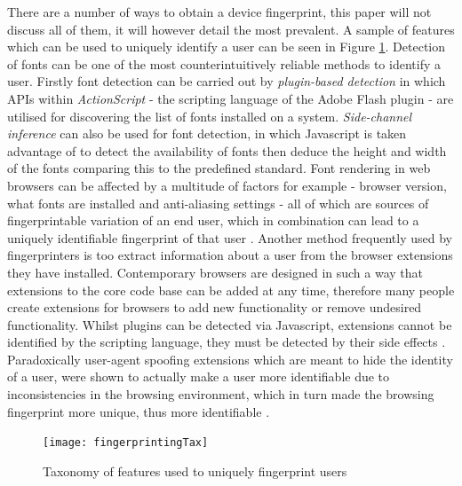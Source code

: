 \documentclass{article}
\begin{document}
There are a number of ways to obtain a device fingerprint, this paper will not discuss all of them, it will however detail the most prevalent. A sample of features which can be used to uniquely identify a user can be seen in Figure \ref{fig:fingerprintingTax}. Detection of fonts can be one of the most counterintuitively reliable methods to identify a user. Firstly font detection can be carried out by \textit{plugin-based detection} in which APIs within \textit{ActionScript} - the scripting language of the Adobe Flash plugin - are utilised for discovering the list of fonts installed on a system. \textit{Side-channel inference} can also be used for font detection, in which Javascript is taken advantage of to detect the availability of fonts then deduce the height and width of the fonts comparing this to the predefined standard. Font rendering in web browsers can be affected by a multitude of factors for example - browser version, what fonts are installed and anti-aliasing settings - all of which are sources of fingerprintable variation of an end user, which in combination can lead to a uniquely identifiable fingerprint of that user \parencite{fingerprintFonts}. Another method frequently used by fingerprinters is too extract information about a user from the browser extensions they have installed. Contemporary browsers are designed in such a way that extensions to the core code base can be added at any time, therefore many people create extensions for browsers to add new functionality or remove undesired functionality. Whilst plugins can be detected via Javascript, extensions cannot be identified by the scripting language, they must be detected by their side effects \parencite{dustingFP}. Paradoxically user-agent spoofing extensions which are meant to hide the identity of a user, were shown to actually make a user more identifiable due to inconsistencies in the browsing environment, which in turn made the browsing fingerprint more unique, thus more identifiable  \parencite{cookielessMonster}.

\begin{figure}[H]
    \centering
    \texttt{[image: fingerprintingTax]}
    \caption{Taxonomy of features used to uniquely fingerprint users \parencite{cookielessMonster}}
    \label{fig:fingerprintingTax}
\end{figure}
\end{document}
